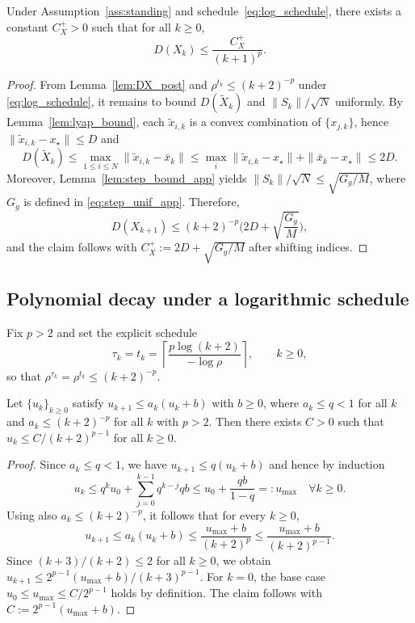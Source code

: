 \documentclass[review,onefignum,onetabnum]{siamart171218}
\begin{document}
	\begin{lemma}\label{lem:DX_post_decay}
		Under Assumption~\ref{ass:standing} and schedule~\eqref{eq:log_schedule}, there exists a constant $C_X^{+}>0$ such that for all $k\ge 0$,
		\[
		D(X_k)\le \frac{C_X^{+}}{(k+1)^{p}}.
		\]
	\end{lemma}
	\begin{proof}
		From Lemma~\ref{lem:DX_post} and $\rho^{t_k}\le (k+2)^{-p}$ under \eqref{eq:log_schedule}, it remains to bound
		$D(\tilde X_k)$ and $\|S_k\|/\sqrt N$ uniformly.
		By Lemma~\ref{lem:lyap_bound}, each $\tilde x_{i,k}$ is a convex combination of $\{x_{j,k}\}$, hence $\|\tilde x_{i,k}-x_\star\|\le D$ and
		\[
		D(\tilde X_k)\le \max_{1\le i\le N}\|\tilde x_{i,k}-\bar x_k\|
		\le \max_i \|\tilde x_{i,k}-x_\star\|+\|\bar x_k-x_\star\|\le 2D.
		\]
		Moreover, Lemma~\ref{lem:step_bound_app} yields $\|S_k\|/\sqrt N\le \sqrt{G_g/M}$, where $G_g$ is defined in \eqref{eq:step_unif_app}.
		Therefore,
		\[
		D(X_{k+1})\le (k+2)^{-p}\Big(2D+\sqrt{\frac{G_g}{M}}\Big),
		\]
		and the claim follows with $C_X^{+}:=2D+\sqrt{G_g/M}$ after shifting indices.
	\end{proof}
	
	\subsection{Polynomial decay under a logarithmic schedule}
	
	Fix $p>2$ and set the explicit schedule
	\begin{equation}\label{eq:log_schedule}
		\tau_k=t_k=\left\lceil \frac{p\log(k+2)}{-\log\rho}\right\rceil,\qquad k\ge 0,
	\end{equation}
	so that $\rho^{\tau_k}=\rho^{t_k}\le (k+2)^{-p}$.
	
	\begin{lemma}\label{lem:compare}
		Let $\{u_k\}_{k\ge0}$ satisfy $u_{k+1}\le a_k(u_k+b)$ with $b\ge0$, where
		$a_k\le q<1$ for all $k$ and $a_k\le (k+2)^{-p}$ for all $k$ with $p>2$.
		Then there exists $C>0$ such that $u_k\le C/(k+2)^{p-1}$ for all $k\ge0$.
	\end{lemma}
	\begin{proof}
		Since $a_k\le q<1$, we have $u_{k+1}\le q(u_k+b)$ and hence by induction
		\[
		u_k\le q^k u_0+\sum_{j=0}^{k-1} q^{k-j}qb \le u_0+\frac{qb}{1-q}=:u_{\max}\quad \forall k\ge 0.
		\]
		Using also $a_k\le (k+2)^{-p}$, it follows that for every $k\ge 0$,
		\[
		u_{k+1}\le a_k(u_k+b)\le \frac{u_{\max}+b}{(k+2)^{p}}\le \frac{u_{\max}+b}{(k+2)^{p-1}}.
		\]
		Since $(k+3)/(k+2)\le 2$ for all $k\ge 0$, we obtain
		$u_{k+1}\le 2^{p-1}(u_{\max}+b)/(k+3)^{p-1}$.
		For $k=0$, the base case $u_0\le u_{\max}\le C/2^{p-1}$ holds by definition.
		The claim follows with $C:=2^{p-1}(u_{\max}+b)$.
	\end{proof}
	
\end{document}
